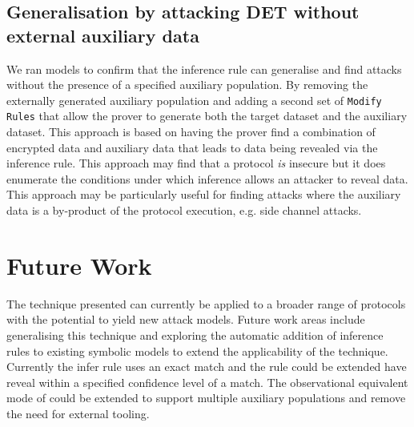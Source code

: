 \documentclass[journal]{IEEEtran}
\begin{document}
\subsection{Generalisation by attacking DET without external auxiliary data}
We ran models to confirm that the inference rule can generalise and find attacks without the presence of a specified auxiliary population. By removing the externally generated auxiliary population and adding a second set of \texttt{Modify Rules} that allow the prover to generate both the target dataset and the auxiliary dataset. This approach is based on having the prover find a combination of encrypted data and auxiliary data that leads to data being revealed via the inference rule. This approach may find that a protocol \textit{is} insecure but it does enumerate the conditions under which inference allows an attacker to reveal data. This approach may be particularly useful for finding attacks where the auxiliary data is a by-product of the protocol execution, e.g. side channel attacks.

\section{Future Work}
The technique presented can currently be applied to a broader range of protocols with the potential to yield new attack models. Future work areas include generalising this technique and exploring the automatic addition of inference rules to existing symbolic models to extend the applicability of the technique. Currently the infer rule uses an exact match and the rule could be extended have reveal within a specified confidence level of a match. The observational equivalent mode of \tamarin{} could be extended to support multiple auxiliary populations and remove the need for external tooling. 




\end{document}
